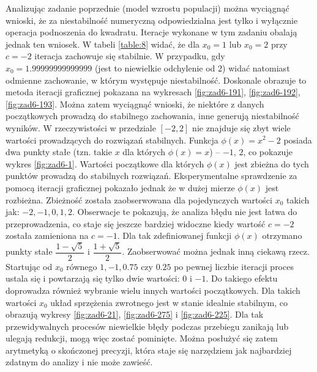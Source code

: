 \documentclass[11pt]{mk-polish-lab-report}
\begin{document}
Analizując zadanie poprzednie (model wzrostu populacji) można wyciągnąć wnioski, że za niestabilność numeryczną odpowiedzialna jest tylko i wyłącznie operacja podnoszenia do kwadratu. Iteracje wykonane w tym zadaniu obalają jednak ten wniosek. W tabeli \ref{table:8} widać, że dla $x_0 = 1$ lub $x_0 = 2$ przy $c = -2$ iteracja zachowuje się stabilnie. W przypadku, gdy $x_0 = 1.99999999999999$ (jest to niewielkie odchylenie od $2$) widać natomiast odmienne zachowanie, w którym występuje niestabilność. Doskonale obrazuje to metoda iteracji graficznej pokazana na wykresach \ref{fig:zad6-191}, \ref{fig:zad6-192}, \ref{fig:zad6-193}. Można zatem wyciągnąć wnioski, że niektóre z danych początkowych prowadzą do stabilnego zachowania, inne generują niestabilność wyników. W rzeczywistości w przedziale $[-2, 2]$ nie znajduje się zbyt wiele wartości prowadzących do rozwiązań stabilnych. Funkcja $\phi(x) = x^2 - 2$ posiada dwa punkty stałe (tzn. takie $x$ dla których $\phi(x) = x$) -- $-1$, $2$, co pokazuje wykres \ref{fig:zad6-1}. Wartości początkowe dla których $\phi(x)$ jest zbieżna do tych punktów prowadzą do stabilnych rozwiązań. Eksperymentalne sprawdzenie za pomocą iteracji graficznej pokazało jednak że w dużej mierze $\phi(x)$ jest rozbieżna. Zbieżność została zaobserwowana dla pojedynczych wartości $x_0$ takich jak: $-2, -1, 0, 1, 2$. Obserwacje te pokazują, że analiza błędu nie jest łatwa do przeprowadzenia, co staje się jeszcze bardziej widoczne kiedy wartość $c = -2$ została zamieniona na $c = -1$. Dla tak zdefiniowanej funkcji $\phi(x)$ otrzymano punkty stałe $\dfrac{1-\sqrt{5}}{2}$ i $\dfrac{1+\sqrt{5}}{2}$. Zaobserwować można jednak inną ciekawą rzecz. Startując od $x_0$ równego $1, -1, 0.75$ czy $0.25$ po pewnej liczbie iteracji proces ustala się i powtarzają się tylko dwie wartości: $0$ i $-1$. Do takiego efektu doprowadza również wybranie wielu innych wartości początkowych. Dla takich wartości $x_0$ układ sprzężenia zwrotnego jest w stanie idealnie stabilnym, co obrazują wykresy \ref{fig:zad6-21}, \ref{fig:zad6-275} i \ref{fig:zad6-225}. Dla tak przewidywalnych procesów niewielkie błędy podczas przebiegu zanikają lub ulegają redukcji, mogą więc zostać pominięte. Można posłużyć się zatem arytmetyką o skończonej precyzji, która staje się narzędziem jak najbardziej zdatnym do analizy i nie może zawieść.

%
\end{document}

